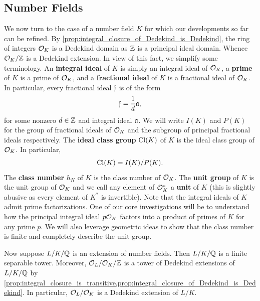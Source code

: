     \subsection*{Number Fields}
      We now turn to the case of a number field \(K\) for which our developments so far can be refined. By \cref{prop:integral_closure_of_Dedekind_is_Dedekind}, the ring of integers \(\mathcal{O}_{K}\) is a Dedekind domain as \(\mathbb{Z}\) is a principal ideal domain. Whence \(\mathcal{O}_{K}/\mathbb{Z}\) is a Dedekind extension. In view of this fact, we simplify some terminology. An \textbf{integral ideal} of \(K\) is simply an integral ideal of \(\mathcal{O}_{K}\), a \textbf{prime} of \(K\) is a prime of \(\mathcal{O}_{K}\), and a \textbf{fractional ideal} of \(K\) is a fractional ideal of \(\mathcal{O}_{K}\). In particular, every fractional ideal \(\mathfrak{f}\) is of the form
      \[
        \mathfrak{f} = \frac{1}{d}\mathfrak{a},
      \]
      for some nonzero \(d \in \mathbb{Z}\) and integral ideal \(\mathfrak{a}\). We will write \(I(K)\) and \(P(K)\) for the group of fractional ideals of \(\mathcal{O}_{K}\) and the subgroup of principal fractional ideals respectively. The \textbf{ideal class group} \(\operatorname{\mathrm{Cl}}(K)\) of \(K\) is the ideal class group of \(\mathcal{O}_{K}\). In particular,
      \[
        \operatorname{\mathrm{Cl}}(K) = I(K)/P(K).
      \]
      The \textbf{class number} \(h_{K}\) of \(K\) is the class number of \(\mathcal{O}_{K}\). The \textbf{unit group} of \(K\) is the unit group of \(\mathcal{O}_{K}\) and we call any element of \(\mathcal{O}_{K}^{\ast}\) a \textbf{unit} of \(K\) (this is slightly abusive as every element of \(K^{\ast}\) is invertible). Note that the integral ideals of \(K\) admit prime factorizations. One of our core investigations will be to understand how the principal integral ideal \(p\mathcal{O}_{K}\) factors into a product of primes of \(K\) for any prime \(p\). We will also leverage geometric ideas to show that the class number is finite and completely describe the unit group.

      Now suppose \(L/K/\mathbb{Q}\) is an extension of number fields. Then \(L/K/\mathbb{Q}\) is a finite separable tower. Moreover, \(\mathcal{O}_{L}/\mathcal{O}_{K}/\mathbb{Z}\) is a tower of Dedekind extensions of \(L/K/\mathbb{Q}\) by \cref{prop:integral_closure_is_transitive,prop:integral_closure_of_Dedekind_is_Dedekind}. In particular, \(\mathcal{O}_{L}/\mathcal{O}_{K}\) is a Dedekind extension of \(L/K\).
